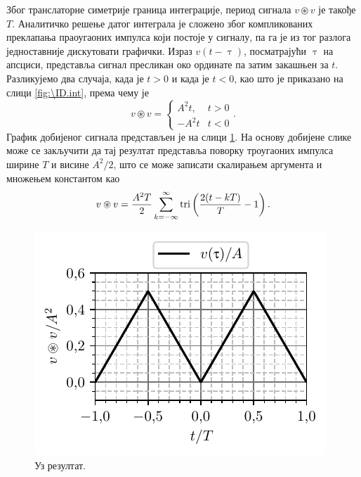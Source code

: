 Због транслаторне симетрије граница интеграције, период сигнала $v\circledast v$ је такође $T$.
Аналитичко решење датог интеграла је сложено због компликованих преклапања праоугаоних импулса који 
постоје у сигналу, па га је из тог разлога једноставније дискутовати графички. Израз 
$v(t-\uptau)$, посматрајући $\uptau$ на апсциси, представља сигнал пресликан око ординате па затим 
закашњен за $t$. Разликујемо два случаја, када је $t>0$ и када је $t<0$, као што је приказано 
на слици \ref{fig:\ID.int}, према чему је 
\begin{equation}
    v \circledast v = \begin{cases}
        A^2 t, & t > 0 \\
        -A^2 t & t < 0
    \end{cases}.
\end{equation}
График добијеног сигнала представљен је на слици \ref{fig:\ID.kk}. На основу добијене слике може се закључити да тај 
резултат представља поворку троугаоних импулса ширине $T$ и висине $A^2/2$, што се може записати скалирањем 
аргумента и множењем константом као 
\begin{equation}
    v \circledast v = 
    \dfrac{A^2 T}{2}
    \sum_{k = -\infty}^{\infty}  
    {\rm tri}\left( 
    \dfrac{2(t - kT)}{T} - 1
    \right).    
\end{equation}

\begin{figure}[ht!]
    \centering
    \includegraphics{fig/cconv_r3.pdf}
    \caption{Уз резултат.}
    \label{fig:\ID.kk}
\end{figure}

